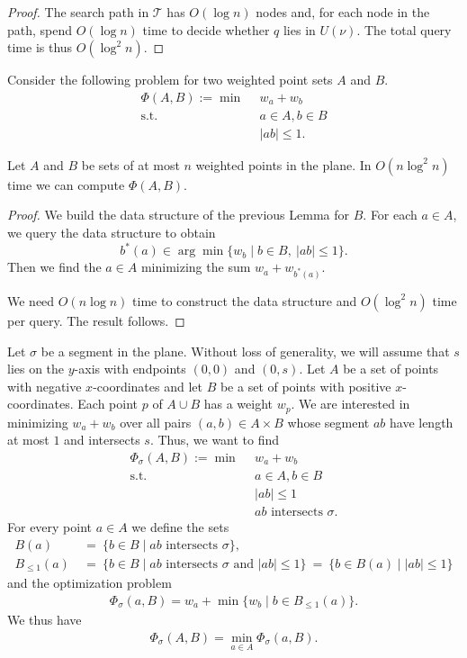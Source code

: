 \documentclass[a4paper,USenglish,numberwithinsect]{lipics}
\newcommand{\T}{\ensuremath{\mathcal{T}}}
\let\le\leqslant
\begin{document}
\begin{proof}
	The search path in $\T$ has $O(\log n)$ nodes and, for each node in the path,
	spend $O(\log n)$ time to decide whether $q$ lies in $U(\nu)$. The total
	query time is thus $O(\log^2 n)$.	 
\end{proof}

Consider the following problem for two weighted point sets $A$ and $B$.
\begin{align*}
	\Phi(A,B) :=\min ~~		& w_a+w_b\\
	 \mbox{s.t.}~~ & a \in A, b\in B\\
				&	|ab|\le 1. 
\end{align*}

\begin{lemma}
\label{le:within}
	Let $A$ and $B$ be sets of at most $n$ weighted points in the plane.
	In $O(n\log^2 n)$ time we can compute $\Phi(A,B)$.
\end{lemma}
\begin{proof}
	We build the data structure of the previous Lemma for $B$.
	For each $a\in A$, we query the data structure to obtain
	\[	
		b^*(a) \in \arg\min \{ w_b \mid b\in B,~|ab|\le 1\}.
	\]
	Then we find the $a\in A$ minimizing the sum $w_a+w_{b^*(a)}$.	

	We need $O(n\log n)$ time to construct the data structure and 
	$O(\log^2 n)$ time per query. The result follows.
\end{proof}


Let $\sigma$ be a segment in the plane. 
Without loss of generality, we will assume that $s$ lies on
the $y$-axis with endpoints $(0,0)$ and $(0,s)$.
Let $A$ be a set of points with negative $x$-coordinates 
and let $B$ be a set of points with positive $x$-coordinates.
Each point $p$ of $A\cup B$ has a weight $w_p$.
We are interested in minimizing $w_a+w_b$ over all pairs $(a,b)\in A\times B$
whose segment $ab$ have length at most $1$ and intersects $s$.
Thus, we want to find
\begin{align*}
	\Phi_\sigma(A,B) :=\min ~~		& w_a+w_b\\
	 \mbox{s.t.}~~ & a\in A, b\in B\\
				&	|ab|\le 1\\
				&	\mbox{$ab$ intersects $\sigma$}. 
\end{align*}
For every point $a\in A$ we define the sets
\begin{align*}
	B(a)~&=~\{ b\in B\mid \text{$ab$ intersects $\sigma$}\},\\
	B_{\le 1}(a)~&=~ \{ b\in B\mid \text{$ab$ intersects $\sigma$ and $|ab|\le 1$}\} 
			~=~ \{ b\in B(a)\mid |ab|\le 1\}
\end{align*}
and the optimization problem
\begin{align*}
	\Phi_\sigma(a,B) = w_a + \min \{ w_b\mid b\in B_{\le 1}(a)\}.
\end{align*}
We thus have
\begin{align*}
	\Phi_\sigma(A,B) = \min_{a\in A} \Phi_\sigma(a,B).
\end{align*}
\end{document}
